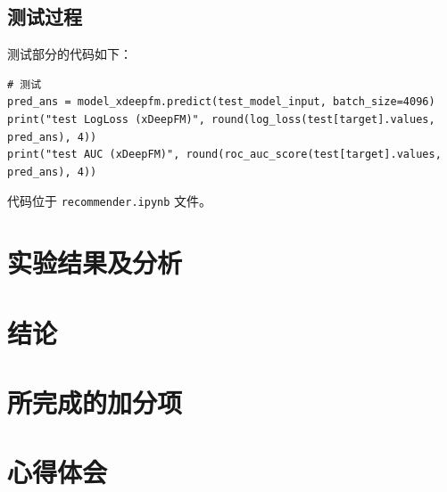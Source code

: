 \documentclass[degree=project,degree-type=project,cjk-font=noto]{thuthesis}
\begin{document}
\section{测试过程}

测试部分的代码如下：

  \begin{verbatim}
# 测试
pred_ans = model_xdeepfm.predict(test_model_input, batch_size=4096)
print("test LogLoss (xDeepFM)", round(log_loss(test[target].values, pred_ans), 4))
print("test AUC (xDeepFM)", round(roc_auc_score(test[target].values, pred_ans), 4))
  \end{verbatim}


代码位于 \texttt{recommender.ipynb} 文件。

\chapter{实验结果及分析}

\chapter{结论}

\chapter{所完成的加分项}

\chapter{心得体会}

\backmatter


\appendix
\end{document}
